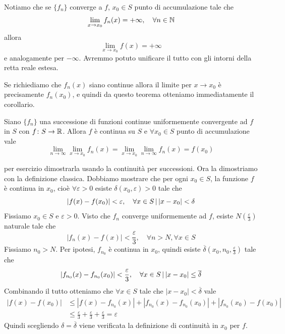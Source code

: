 \documentclass[a4paper]{article}
\begin{document}
\begin{radioactive}
Notiamo che se \(\{f_n\}\) converge a \(f\), \(x_0 \in S\)
punto di accumulazione tale che
\[
    \lim_{x\to x_0} f_n(x)=+\infty,
    \quad \forall n\in\mathbb{N}
\]
allora
\[
    \lim_{x \to x_0} f(x) = +\infty
\]
e analogamente per \(-\infty\).
Avremmo potuto unificare il tutto con gli intorni della retta reale estesa.

Se richiediamo che \(f_n(x)\) siano continue allora il limite per \(x \to x_0\)
è precisamente \(f_n(x_0)\), e quindi da questo teorema otteniamo immediatamente il corollario.
\end{radioactive}

\begin{radioactive}
\begin{snippetcorollary}{}
    Siano \(\{f_n\}\) una successione di funzioni continue uniformemente convergente ad \(f\)
    in \(S\) con \(f \colon S \to \mathbb{R}\).
    Allora \(f\) è continua su \(S\) e \(\forall x_0 \in S\) punto di accumulazione vale
    \[
        \lim_{n \to \infty} \lim_{x \to x_0} f_n(x)
        = \lim_{x \to x_0} \lim_{n \to \infty} f_n(x) = f(x_0)
    \]
\end{snippetcorollary}
\end{radioactive}

\begin{radioactive}
\begin{snippetproof}{}
    per esercizio dimostrarla usando la continuità
    per successioni. Ora la dimostriamo con la definizione classica.
    Dobbiamo mostrare che per ogni \(x_0 \in S\),
    la funzione \(f\) è continua in \(x_0\),
    cioè \(\forall \varepsilon > 0\) esiste \(\delta(x_0, \varepsilon) > 0\)
    tale che \[
        |f(x) - f(x_0)| < \varepsilon, \quad \forall x \in S \,|\, |x-x_0| < \delta
    \]
    Fissiamo \(x_0 \in S\) e \(\varepsilon > 0\).
    Visto che \(f_n\) converge uniformemente ad \(f\), esiste \(N\left(\frac{\varepsilon}{3}\right)\)
    naturale tale che
    \[
        |f_n(x) - f(x)| < \frac{\varepsilon}{3}, \quad \forall n > N, \forall x \in S
    \]
    Fissiamo \(n_0 > N\).
    Per ipotesi, \(f_{n_0}\) è continua in \(x_0\),
    quindi esiste \(\overline \delta\left(x_0, n_0, \frac{\varepsilon}{3}\right)\) tale che
    \[
        |f_{n_0}(x) - f_{n_0}(x_0)| < \frac{\varepsilon}{3},
        \quad \forall x \in S \,|\, |x-x_0| \leq \overline\delta
    \]
    Combinando il tutto otteniamo che \(\forall x \in S\) tale che \(|x-x_0| < \overline\delta\) vale
    \begin{align*}
        |f(x)-f(x_0)| &\leq |f(x)-f_{n_0}(x)|+|f_{n_0}(x)-f_{n_0}(x_0)|
        +|f_{n_0}(x_0)-f(x_0)| \\
        &\leq \frac{\varepsilon}{3} + \frac{\varepsilon}{3} + \frac{\varepsilon}{3} = \varepsilon
    \end{align*}
    Quindi scegliendo \(\delta = \overline \delta\) viene verificata la definizione di continuità in \(x_0\)
    per \(f\).
\end{snippetproof}
\end{radioactive}
\end{document}
